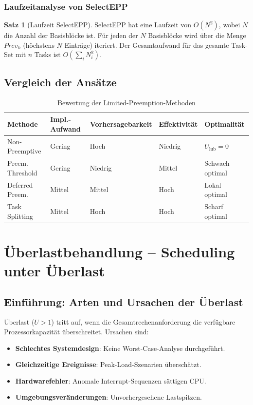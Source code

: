 ﻿\documentclass[a4paper,12pt]{report}
\theoremstyle{definition}
\newtheorem{satz}{Satz}[chapter]
\begin{document}
\subsection{Laufzeitanalyse von SelectEPP}

\begin{satz}[Laufzeit SelectEPP]
	SelectEPP hat eine Laufzeit von $O(N^2)$, wobei $N$ die Anzahl der Basisblöcke
	ist. Für jeden der $N$ Basisblöcke wird über die Menge $\mathit{Prev}_k$ (höchstens
	$N$ Einträge) iteriert. Der Gesamtaufwand für das gesamte Task-Set mit $n$
	Tasks ist $O(\sum_i N_i^2)$.
\end{satz}

\section{Vergleich der Ansätze}

\begin{table}[H]
	\centering
	\caption{Bewertung der Limited-Preemption-Methoden}
	\begin{tabular}{p{3cm}p{2cm}p{2.5cm}p{2.5cm}p{2.5cm}}
		\toprule
		\textbf{Methode} & \textbf{Impl.-Aufwand} & \textbf{Vorhersage\-barkeit} & \textbf{Effektivität} & \textbf{Optimalität} \\
		\midrule
		Non-Preemptive  & Gering   & Hoch    & Niedrig  & $U_{\text{lub}} = 0$ \\
		Preem. Threshold & Gering  & Niedrig & Mittel   & Schwach optimal \\
		Deferred Preem. & Mittel   & Mittel  & Hoch     & Lokal optimal \\
		Task Splitting   & Mittel  & Hoch    & Hoch     & Scharf optimal \\
		\bottomrule
	\end{tabular}
\end{table}

\chapter{Überlastbehandlung -- Scheduling unter Überlast}
\label{chap:uberlast}

\section{Einführung: Arten und Ursachen der Überlast}

Überlast ($U > 1$) tritt auf, wenn die Gesamtrechenanforderung die verfügbare
Prozessorkapazität überschreitet. Ursachen sind:
\begin{itemize}
	\item \textbf{Schlechtes Systemdesign}: Keine Worst-Case-Analyse durchgeführt.
	\item \textbf{Gleichzeitige Ereignisse}: Peak-Load-Szenarien überschätzt.
	\item \textbf{Hardwarefehler}: Anomale Interrupt-Sequenzen sättigen CPU.
	\item \textbf{Umgebungsveränderungen}: Unvorhergesehene Lastspitzen.
\end{itemize}
\end{document}
